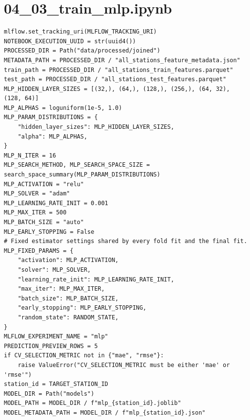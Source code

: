 \section{04\_03\_train\_mlp.ipynb}

\begin{verbatim}
mlflow.set_tracking_uri(MLFLOW_TRACKING_URI)
NOTEBOOK_EXECUTION_UUID = str(uuid4())
PROCESSED_DIR = Path("data/processed/joined")
METADATA_PATH = PROCESSED_DIR / "all_stations_feature_metadata.json"
train_path = PROCESSED_DIR / "all_stations_train_features.parquet"
test_path = PROCESSED_DIR / "all_stations_test_features.parquet"
MLP_HIDDEN_LAYER_SIZES = [(32,), (64,), (128,), (256,), (64, 32), (128, 64)]
MLP_ALPHAS = loguniform(1e-5, 1.0)
MLP_PARAM_DISTRIBUTIONS = {
    "hidden_layer_sizes": MLP_HIDDEN_LAYER_SIZES,
    "alpha": MLP_ALPHAS,
}
MLP_N_ITER = 16
MLP_SEARCH_METHOD, MLP_SEARCH_SPACE_SIZE = search_space_summary(MLP_PARAM_DISTRIBUTIONS)
MLP_ACTIVATION = "relu"
MLP_SOLVER = "adam"
MLP_LEARNING_RATE_INIT = 0.001
MLP_MAX_ITER = 500
MLP_BATCH_SIZE = "auto"
MLP_EARLY_STOPPING = False
# Fixed estimator settings shared by every fold fit and the final fit.
MLP_FIXED_PARAMS = {
    "activation": MLP_ACTIVATION,
    "solver": MLP_SOLVER,
    "learning_rate_init": MLP_LEARNING_RATE_INIT,
    "max_iter": MLP_MAX_ITER,
    "batch_size": MLP_BATCH_SIZE,
    "early_stopping": MLP_EARLY_STOPPING,
    "random_state": RANDOM_STATE,
}
MLFLOW_EXPERIMENT_NAME = "mlp"
PREDICTION_PREVIEW_ROWS = 5
if CV_SELECTION_METRIC not in {"mae", "rmse"}:
    raise ValueError("CV_SELECTION_METRIC must be either 'mae' or 'rmse'")
station_id = TARGET_STATION_ID
MODEL_DIR = Path("models")
MODEL_PATH = MODEL_DIR / f"mlp_{station_id}.joblib"
MODEL_METADATA_PATH = MODEL_DIR / f"mlp_{station_id}.json"
\end{verbatim}

